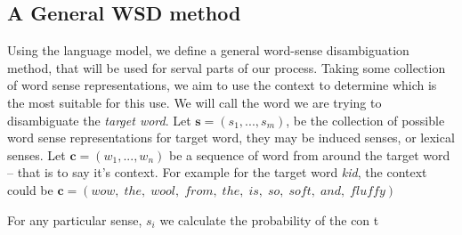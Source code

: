 \documentclass{sig-alternate}
\begin{document}
\subsection{A General WSD method}
Using the language model, we define a general word-sense disambiguation method, that will be used for serval parts of our process.
Taking some collection of word sense representations, we aim to use the context to determine which is the most suitable for this use.
We will call the word we are trying to disambiguate the \emph{target word}.
Let $\mathbf{s}=(s_{1},...,s_{m})$, be the collection of possible word sense representations for target word, they may be induced senses, or lexical senses.
Let $\mathbf{c}=(w_{1},...,w_{n})$ be a sequence of word from around the target word -- that is to say it's context.
For example for the target word \emph{kid}, the context could be $\mathbf{c}=(wow,\; the,\; wool,\; from,\; the,\; is,\; so,\; soft,\; and,\; fluffy)$
 
For any particular sense, $s_i$ we calculate the probability of the con t
\end{document}
